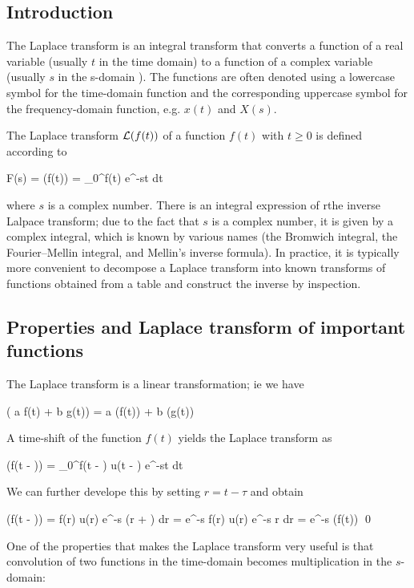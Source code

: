 
\subsection{Introduction}

The Laplace transform is an integral transform that converts a function of a real variable (usually $t$ in the time domain) to a function of a complex variable (usually $s$ in the s-domain ). The functions are often denoted using a lowercase symbol for the time-domain function and the corresponding uppercase symbol for the frequency-domain function, e.g. $x(t)$ and $X(s)$. 


The Laplace transform $\mathcal{L} (f(t))$ of a function $f(t)$ with $t \geq 0$ is defined according to

\be\label{2026-01-04:eq1}
F(s) = (f(t)) = \int_0^\infty f(t) e^{-st} dt
\ee

where $s$ is a complex number. There is an integral expression of rthe inverse Lalpace transform; due to the fact that $s$ is a complex number, it is given by a complex integral, which is known by various names (the Bromwich integral, the Fourier–Mellin integral, and Mellin's inverse formula). In practice, it is typically more convenient to decompose a Laplace transform into known transforms of functions obtained from a table and construct the inverse by inspection.


\subsection{Properties and Laplace transform of important functions}

The Laplace transform is a linear transformation; ie we have

\bee
\Lc( a f(t) + b g(t)) = a \Lc (f(t)) + b \Lc(g(t))
\eee

A time-shift of the function $f(t)$ yields the Laplace transform as

\bee
\Lc(f(t - \tau)) = \int_0^\infty f(t - \tau) u(t - \tau) e^{-st} dt
\eee

We can further develope this by setting $r = t - \tau$ and obtain

\bee
\Lc(f(t - \tau)) = \int f(r) u(r) e^{-s (r + \tau)} dr = e^{-s \tau} \int f(r) u(r) e^{-s r} dr = e^{-s \tau} \Lc(f(t)) \qed
\eee

One of the properties that makes the Laplace transform very useful is that convolution of two functions in the time-domain becomes multiplication in the $s$-domain:

